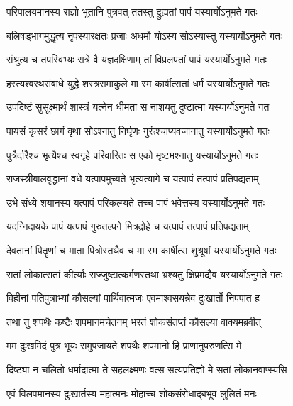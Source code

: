 \twolineshloka
{परिपालयमानस्य राज्ञो भूतानि पुत्रवत्}
{ततस्तु द्रुह्यतां पापं यस्यार्योऽनुमते गतः} %

\twolineshloka
{बलिषड्भागमुद्धृत्य नृपस्यारक्षतः प्रजाः}
{अधर्मो योऽस्य सोऽस्यास्तु यस्यार्योऽनुमते गतः} %

\twolineshloka
{संश्रुत्य च तपस्विभ्यः सत्रे वै यज्ञदक्षिणाम्}
{तां विप्रलपतां पापं यस्यार्योऽनुमते गतः} %

\twolineshloka
{हस्त्यश्वरथसंबाधे युद्धे शस्त्रसमाकुले}
{मा स्म कार्षीत्सतां धर्मं यस्यार्योऽनुमते गतः} %

\twolineshloka
{उपदिष्टं सुसूक्ष्मार्थं शास्त्रं यत्नेन धीमता}
{स नाशयतु दुष्टात्मा यस्यार्योऽनुमते गतः} %

\twolineshloka
{पायसं कृसरं छागं वृथा सोऽश्नातु निर्घृणः}
{गुरूंश्चाप्यवजानातु यस्यार्योऽनुमते गतः} %

\twolineshloka
{पुत्रैर्दारैश्च भृत्यैश्च स्वगृहे परिवारितः}
{स एको मृष्टमश्नातु यस्यार्योऽनुमते गतः} %

\twolineshloka
{राजस्त्रीबालवृद्धानां वधे यत्पापमुच्यते}
{भृत्यत्यागे च यत्पापं तत्पापं प्रतिपद्यताम्} %

\twolineshloka
{उभे संध्ये शयानस्य यत्पापं परिकल्प्यते}
{तच्च पापं भवेत्तस्य यस्यार्योऽनुमते गतः} %

\twolineshloka
{यदग्निदायके पापं यत्पापं गुरुतल्पगे}
{मित्रद्रोहे च यत्पापं तत्पापं प्रतिपद्यताम्} %

\twolineshloka
{देवतानां पितॄणां च माता पित्रोस्तथैव च}
{मा स्म कार्षीत्स शुश्रूषां यस्यार्योऽनुमते गतः} %

\twolineshloka
{सतां लोकात्सतां कीर्त्याः सज्जुष्टात्कर्मणस्तथा}
{भ्रश्यतु क्षिप्रमद्यैव यस्यार्योऽनुमते गतः} %

\twolineshloka
{विहीनां पतिपुत्राभ्यां कौसल्यां पार्थिवात्मजः}
{एवमाश्वसयन्नेव दुःखार्तो निपपात ह} %

\twolineshloka
{तथा तु शपथैः कष्टैः शपमानमचेतनम्}
{भरतं शोकसंतप्तं कौसल्या वाक्यमब्रवीत्} %

\twolineshloka
{मम दुःखमिदं पुत्र भूयः समुपजायते}
{शपथैः शपमानो हि प्राणानुपरुणत्सि मे} %

\twolineshloka
{दिष्ट्या न चलितो धर्मादात्मा ते सहलक्ष्मणः}
{वत्स सत्यप्रतिज्ञो मे सतां लोकानवाप्स्यसि} %

\twolineshloka
{एवं विलपमानस्य दुःखार्तस्य महात्मनः}
{मोहाच्च शोकसंरोधाद्बभूव लुलितं मनः} %


